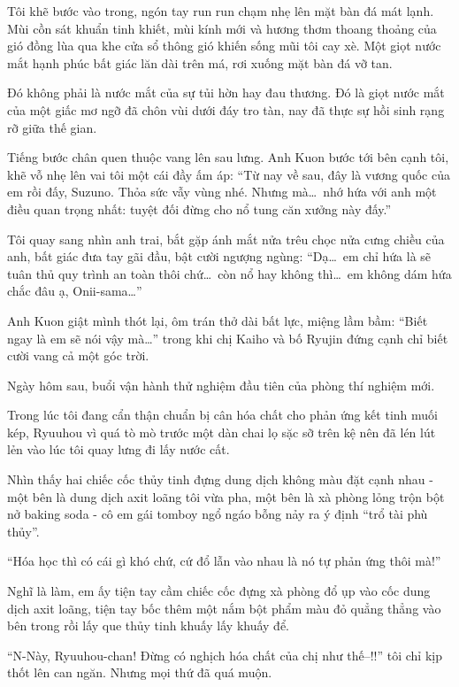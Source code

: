 \documentclass[../main.tex]{subfiles}
\begin{document}
Tôi khẽ bước vào trong, ngón tay run run chạm nhẹ lên mặt bàn đá mát lạnh. Mùi cồn sát khuẩn tinh khiết, mùi kính mới và hương thơm thoang thoảng của gió đồng lùa qua khe cửa sổ thông gió khiến sống mũi tôi cay xè. Một giọt nước mắt hạnh phúc bất giác lăn dài trên má, rơi xuống mặt bàn đá vỡ tan.

Đó không phải là nước mắt của sự tủi hờn hay đau thương. Đó là giọt nước mắt của một giấc mơ ngỡ đã chôn vùi dưới đáy tro tàn, nay đã thực sự hồi sinh rạng rỡ giữa thế gian.

Tiếng bước chân quen thuộc vang lên sau lưng. Anh Kuon bước tới bên cạnh tôi, khẽ vỗ nhẹ lên vai tôi một cái đầy ấm áp: ``Từ nay về sau, đây là vương quốc của em rồi đấy, Suzuno. Thỏa sức vẫy vùng nhé. Nhưng mà\dots\ nhớ hứa với anh một điều quan trọng nhất: tuyệt đối đừng cho nổ tung căn xưởng này đấy.''

Tôi quay sang nhìn anh trai, bắt gặp ánh mắt nửa trêu chọc nửa cưng chiều của anh, bất giác đưa tay gãi đầu, bật cười ngượng ngùng: ``Dạ\dots\ em chỉ hứa là sẽ tuân thủ quy trình an toàn thôi chứ\dots\ còn nổ hay không thì\dots\ em không dám hứa chắc đâu ạ, Onii-sama\dots''

Anh Kuon giật mình thót lại, ôm trán thở dài bất lực, miệng lầm bầm: ``Biết ngay là em sẽ nói vậy mà\dots'' trong khi chị Kaiho và bố Ryujin đứng cạnh chỉ biết cười vang cả một góc trời.

\omk

Ngày hôm sau, buổi vận hành thử nghiệm đầu tiên của phòng thí nghiệm mới.

Trong lúc tôi đang cẩn thận chuẩn bị cân hóa chất cho phản ứng kết tinh muối kép, Ryuuhou vì quá tò mò trước một dàn chai lọ sặc sỡ trên kệ nên đã lén lút lẻn vào lúc tôi quay lưng đi lấy nước cất.

Nhìn thấy hai chiếc cốc thủy tinh đựng dung dịch không màu đặt cạnh nhau - một bên là dung dịch axit loãng tôi vừa pha, một bên là xà phòng lỏng trộn bột nở baking soda - cô em gái tomboy ngổ ngáo bỗng nảy ra ý định ``trổ tài phù thủy''.

``Hóa học thì có cái gì khó chứ, cứ đổ lẫn vào nhau là nó tự phản ứng thôi mà!''

Nghĩ là làm, em ấy tiện tay cầm chiếc cốc đựng xà phòng đổ ụp vào cốc dung dịch axit loãng, tiện tay bốc thêm một nắm bột phẩm màu đỏ quẳng thẳng vào bên trong rồi lấy que thủy tinh khuấy lấy khuấy để.

``N-Này, Ryuuhou-chan! Đừng có nghịch hóa chất của chị như thế--!!'' tôi chỉ kịp thốt lên can ngăn. Nhưng mọi thứ đã quá muộn.
\end{document}
